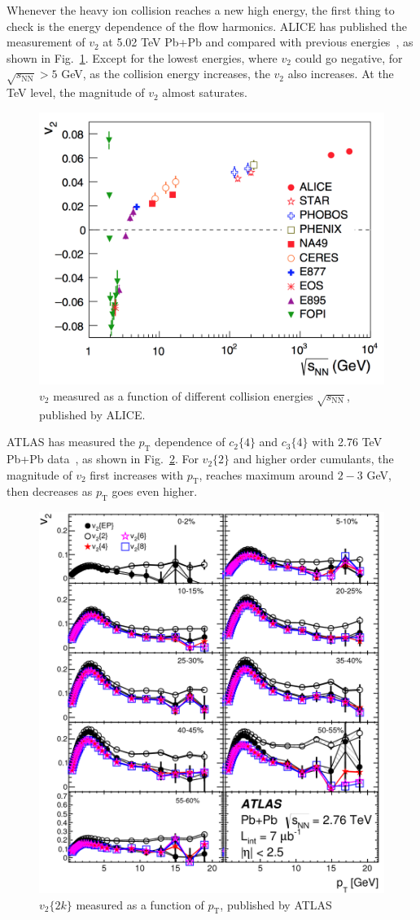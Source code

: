 Whenever the heavy ion collision reaches a new high energy, the first thing to check is the energy dependence of the flow harmonics. ALICE has published the measurement of $v_2$ at 5.02 TeV Pb+Pb and compared with previous energies~\cite{Adam:2016izf}, as shown in Fig.~\ref{fig:result_energyDep_ALICE}. Except for the lowest energies, where $v_2$ could go negative, for $\sqrt{s_\text{NN}}>5$ GeV, as the collision energy increases, the $v_2$ also increases. At the TeV level, the magnitude of $v_2$ almost saturates.
\begin{figure}[H]
\centering
\includegraphics[width=.7\linewidth]{figs/sec_result/energyDep_ALICE.png}
\caption{$v_2$ measured as a function of different collision energies $\sqrt{s_\text{NN}}$, published by ALICE.}
\label{fig:result_energyDep_ALICE}
\end{figure}

ATLAS has measured the $p_\text{T}$ dependence of $c_2\{4\}$ and $c_3\{4\}$ with 2.76 TeV Pb+Pb data~\cite{ATLAS:2014vba}, as shown in Fig.~\ref{fig:result_v2v3_pT_ATLAS}. For $v_2\{2\}$ and higher order cumulants, the magnitude of $v_2$ first increases with $p_\text{T}$, reaches maximum around $2-3$ GeV, then decreases as $p_\text{T}$ goes even higher.
\begin{figure}[H]
\centering
\includegraphics[width=.75\linewidth]{figs/sec_result/v2v3_pT_ATLAS.png}
\caption{$v_2\{2k\}$ measured as a function of $p_\text{T}$, published by ATLAS}
\label{fig:result_v2v3_pT_ATLAS}
\end{figure}

